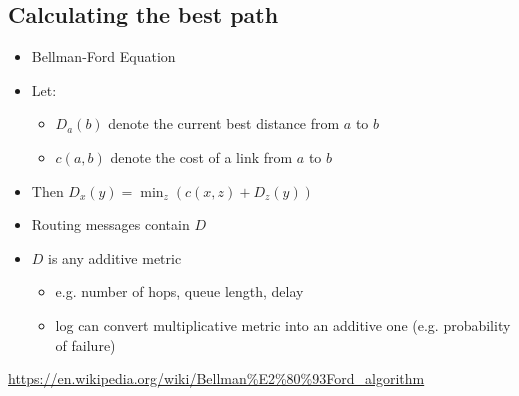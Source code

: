 \subsection{Calculating the best path}
\begin{itemize}[nosep]
    \item Bellman-Ford Equation
    \item Let:
          \begin{itemize}[nosep]
              \item $D_a(b)$ denote the current best distance from $a$ to $b$
              \item $c(a, b)$ denote the cost of a link from $a$ to $b$
          \end{itemize}
    \item Then $D_x(y) = \min_z\left(c(x, z) + D_z(y)\right)$
    \item Routing messages contain $D$
    \item $D$ is any additive metric
          \begin{itemize}[nosep]
              \item e.g. number of hops, queue length, delay
              \item log can convert multiplicative metric into an additive one (e.g. probability of failure)
          \end{itemize}
\end{itemize}
\url{https://en.wikipedia.org/wiki/Bellman%E2%80%93Ford_algorithm}

